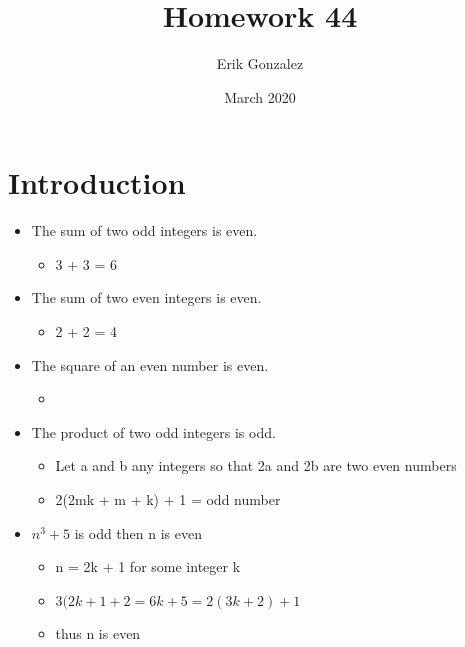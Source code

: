 \documentclass{article}
\title{Homework 44}
\author{Erik Gonzalez }
\date{March 2020}
\begin{document}
\maketitle

\section*{Introduction}

\begin{itemize}
    \item The sum of two odd integers is even.
       \begin{itemize}
          \item 3 + 3 = 6
       \end{itemize}
\end{itemize}

\begin{itemize}
    \item The sum of two even integers is even.
    \begin{itemize}
        \item 2 + 2 = 4
    \end{itemize}
\end{itemize}

\begin{itemize}
    \item The square of an even number is even.
    \begin{itemize}
        \item 
    \end{itemize}
\end{itemize}

\begin{itemize}
    \item The product of two odd integers is odd.
    \begin{itemize}
        \item Let a and b any integers so that 2a and 2b are two even numbers
        \item 2(2mk + m + k) + 1 = odd number
    \end{itemize}
\end{itemize}

\begin{itemize}
    \item $n^3 + 5$ is odd then n  is even 
    \begin{itemize}
        \item n = 2k + 1 for some integer k
        \item $3(2k+1+2 = 6k+5 = 2(3k+2)+1$ 
        \item thus  n is even
    \end{itemize}
\end{itemize}
\end{document}
